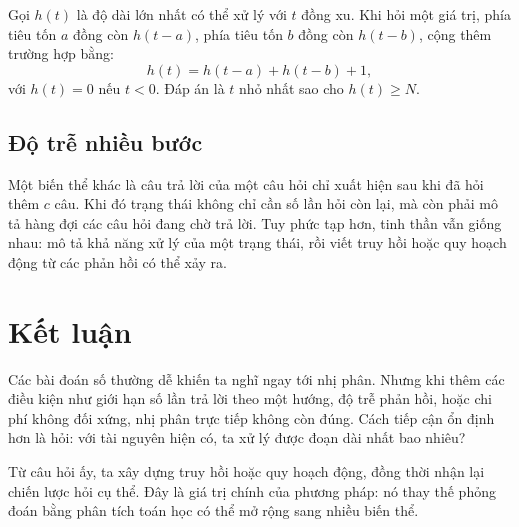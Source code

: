 \documentclass[11pt]{article}
\begin{document}
Gọi \(h(t)\) là độ dài lớn nhất có thể xử lý với \(t\) đồng xu. Khi hỏi một
giá trị, phía tiêu tốn \(a\) đồng còn \(h(t-a)\), phía tiêu tốn \(b\) đồng còn
\(h(t-b)\), cộng thêm trường hợp bằng:
\[
  h(t)=h(t-a)+h(t-b)+1,
\]
với \(h(t)=0\) nếu \(t<0\). Đáp án là \(t\) nhỏ nhất sao cho \(h(t)\ge N\).

\subsection{Độ trễ nhiều bước}

Một biến thể khác là câu trả lời của một câu hỏi chỉ xuất hiện sau khi đã hỏi
thêm \(c\) câu. Khi đó trạng thái không chỉ cần số lần hỏi còn lại, mà còn
phải mô tả hàng đợi các câu hỏi đang chờ trả lời. Tuy phức tạp hơn, tinh thần
vẫn giống nhau: mô tả khả năng xử lý của một trạng thái, rồi viết truy hồi
hoặc quy hoạch động từ các phản hồi có thể xảy ra.

\section{Kết luận}

Các bài đoán số thường dễ khiến ta nghĩ ngay tới nhị phân. Nhưng khi thêm các
điều kiện như giới hạn số lần trả lời theo một hướng, độ trễ phản hồi, hoặc
chi phí không đối xứng, nhị phân trực tiếp không còn đúng. Cách tiếp cận ổn
định hơn là hỏi: với tài nguyên hiện có, ta xử lý được đoạn dài nhất bao
nhiêu?

Từ câu hỏi ấy, ta xây dựng truy hồi hoặc quy hoạch động, đồng thời nhận lại
chiến lược hỏi cụ thể. Đây là giá trị chính của phương pháp: nó thay thế phỏng
đoán bằng phân tích toán học có thể mở rộng sang nhiều biến thể.
\end{document}
